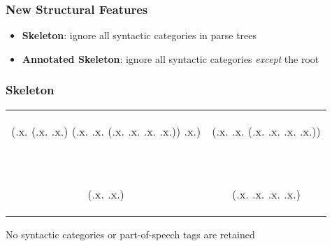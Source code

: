 \documentclass[handouti]{beamer}
\begin{document}
\begin{frame}
    \frametitle{New Structural Features}
    \begin{itemize}
        \itemsep1.5em
        \item \textbf{Skeleton}: ignore all syntactic categories in parse trees
        \item \textbf{Annotated Skeleton}: ignore all syntactic categories
            \emph{except} the root
    \end{itemize}
\end{frame}

\begin{frame}[fragile]
    \frametitle{Skeleton}
    \begin{center}
    \begin{tabular}{cc}
        \begin{parsetree}
            (.x. (.x. .x.) (.x. .x. (.x. .x. .x. .x.)) .x.)
        \end{parsetree} &
        \begin{parsetree}
            (.x. .x. (.x. .x. .x. .x.))
        \end{parsetree} \\
        ~ & ~ \\
        \begin{parsetree}
            (.x. .x.)
        \end{parsetree} &
        \begin{parsetree}
            (.x. .x. .x. .x.)
        \end{parsetree} \\
    \end{tabular}

    \vspace{.2in}
    {\normalsize
    No syntactic categories or part-of-speech tags are retained}
    \end{center}
\end{frame}
\end{document}
